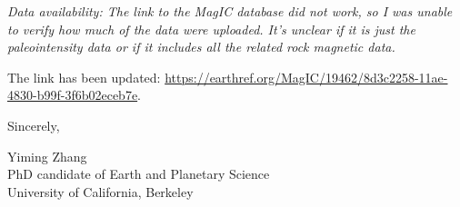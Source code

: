 \documentclass[11pt, letterpaper]{article}
\begin{document}
\begin{flushleft}
\textit{Data availability: The link to the MagIC database did not work, so I was unable to verify how much of the data were uploaded. It's unclear if it is just the paleointensity data or if it includes all the related rock magnetic data.}

The link has been updated: \url{https://earthref.org/MagIC/19462/8d3c2258-11ae-4830-b99f-3f6b02eceb7e}. 


Sincerely,

Yiming Zhang\\

PhD candidate of Earth and Planetary Science\\

University of California, Berkeley




\end{flushleft}
\end{document}
